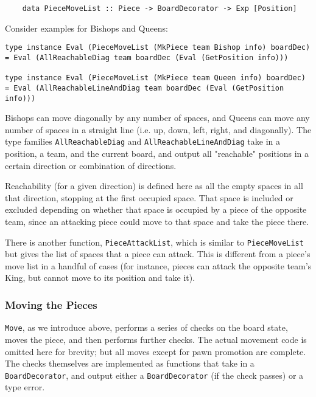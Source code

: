 \documentclass[12pt, a4paper, bibliography=totocnumbered]{scrartcl}
\begin{document}
\begin{lstlisting}
    data PieceMoveList :: Piece -> BoardDecorator -> Exp [Position]
\end{lstlisting}

Consider examples for Bishops and Queens:

\begin{lstlisting}
type instance Eval (PieceMoveList (MkPiece team Bishop info) boardDec) = Eval (AllReachableDiag team boardDec (Eval (GetPosition info)))

type instance Eval (PieceMoveList (MkPiece team Queen info) boardDec) = Eval (AllReachableLineAndDiag team boardDec (Eval (GetPosition info)))
\end{lstlisting}

Bishops can move diagonally by any number of spaces, and Queens can move any number of spaces in a straight line (i.e. up, down, left, right, and diagonally). The type families \lstinline{AllReachableDiag} and \lstinline{AllReachableLineAndDiag} take in a position, a team, and the current board, and output all "reachable" positions in a certain direction or combination of directions.

Reachability (for a given direction) is defined here as all the empty spaces in all that direction, stopping at the first occupied space. That space is included or excluded depending on whether that space is occupied by a piece of the opposite team, since an attacking piece could move to that space and take the piece there.


There is another function, \lstinline{PieceAttackList}, which is similar to \lstinline{PieceMoveList} but gives the list of spaces that a piece can attack. This is different from a piece's move list in a handful of cases (for instance, pieces can attack the opposite team's King, but cannot move to its position and take it).

\subsubsection{Moving the Pieces}

\lstinline{Move}, as we introduce above, performs a series of checks on the board state, moves the piece, and then performs further checks. The actual movement code is omitted here for brevity; but all moves except for pawn promotion are complete. The checks themselves are implemented as functions that take in a \lstinline{BoardDecorator}, and output either a \lstinline{BoardDecorator} (if the check passes) or a type error.
\end{document}
